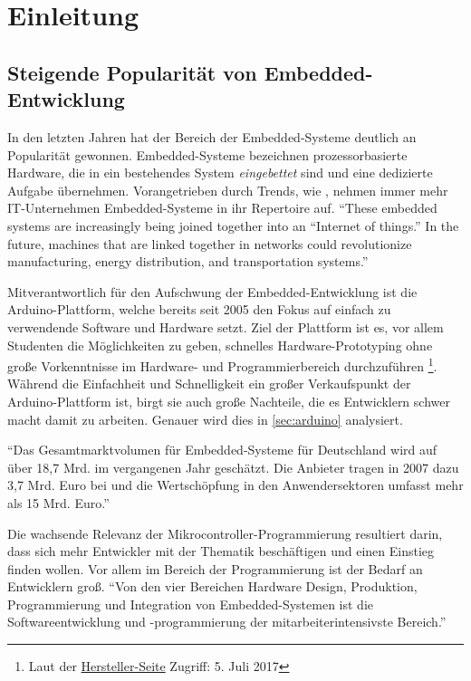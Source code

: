 \section{Einleitung}
	\subsection{Steigende Popularität von Embedded-Entwicklung}
	In den letzten Jahren hat der Bereich der Embedded-Systeme deutlich an Popularität gewonnen.
	Embedded-Systeme bezeichnen prozessorbasierte Hardware, die in ein bestehendes System \textit{eingebettet} sind
	und eine dedizierte Aufgabe übernehmen.
	Vorangetrieben durch Trends, wie , nehmen immer mehr IT-Unternehmen Embedded-Systeme
	in ihr Repertoire auf.
	``These embedded systems are increasingly being joined together into an ``Internet of things.'' In the future,
	machines that are linked together in networks could revolutionize manufacturing, energy distribution, and
	transportation systems.''\citep[]{Siemens2014}

    Mitverantwortlich für den Aufschwung der Embedded-Entwicklung ist die Arduino\hyp{}Plattform, welche bereits seit 2005
    den Fokus auf einfach zu verwendende Software und Hardware setzt. Ziel der Plattform ist es, vor allem Studenten die
    Möglichkeiten zu geben, schnelles Hardware-Prototyping ohne große Vorkenntnisse im Hardware- und Programmierbereich
    durchzuführen
    \footnote{Laut der \href{https://www.arduino.cc/en/Guide/Introduction}{Hersteller-Seite} Zugriff: 5. Juli 2017}.
    Während die Einfachheit und Schnelligkeit ein großer Verkaufspunkt der Arduino\hyp{}Plattform ist, birgt sie auch große
    Nachteile, die es Entwicklern schwer macht damit zu arbeiten. Genauer wird dies in \ref{sec:arduino} analysiert.

	``Das Gesamtmarktvolumen für Embedded-Systeme für Deutschland wird auf über 18,7 Mrd. im vergangenen Jahr geschätzt.
      Die Anbieter tragen in 2007 dazu 3,7 Mrd. Euro bei und die Wertschöpfung in den Anwendersektoren umfasst mehr als
      15 Mrd. Euro.''\citep[vgl. S. 1]{Bitkom2009}

	Die wachsende Relevanz der Mikrocontroller-Programmierung resultiert darin, dass sich mehr Entwickler mit der
	Thematik beschäftigen und einen Einstieg finden wollen. Vor allem im Bereich der Programmierung ist der Bedarf an
	Entwicklern groß.
	``Von den vier Bereichen Hardware Design, Produktion, Programmierung und Integration von Embedded-Systemen
    ist die Softwareentwicklung und -programmierung der mitarbeiterintensivste Bereich.''\citep[vgl. S. 24]{Bitkom2009}

